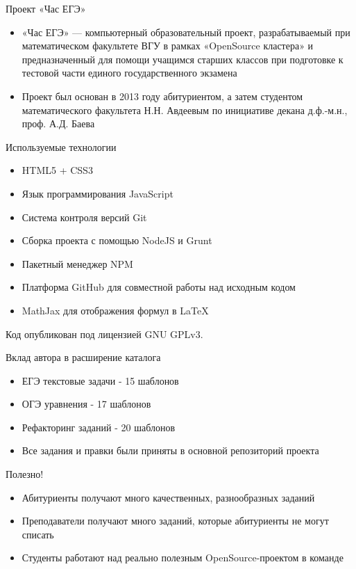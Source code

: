 \documentclass[aspectratio=169,12pt]{beamer}
\begin{document}
  \begin{frame}{Проект «Час ЕГЭ»}
	\large
	\begin{itemize}
		\item «Час ЕГЭ» — компьютерный образовательный проект, разрабатываемый при математическом факультете ВГУ в рамках «OpenSource кластера» и предназначенный для помощи учащимся старших классов при подготовке к тестовой части единого государственного экзамена
		
		\item Проект был основан в 2013 году абитуриентом, а затем студентом математического факультета Н.Н. Авдеевым по инициативе декана д.ф.-м.н., проф. А.Д. Баева
	\end{itemize}
\end{frame}

\begin{frame}{Используемые технологии}
	\begin{itemize}
		\item
			HTML5 + CSS3
		\item
			Язык программирования JavaScript
		\item
			Система контроля версий Git
		\item
			Сборка проекта с помощью NodeJS и Grunt
		\item
			Пакетный менеджер NPM
		\item
			Платформа GitHub для совместной работы над исходным кодом
        \item
			MathJax для отображения формул в \LaTeX
	\end{itemize}
	Код опубликован под лицензией GNU GPLv3.
\end{frame}

\begin{frame}{Вклад автора в расширение каталога}
	\begin{itemize}
		\item ЕГЭ текстовые задачи - 15 шаблонов
		\item ОГЭ уравнения - 17 шаблонов
		\item Рефакторинг заданий - 20 шаблонов
		\item Все задания и правки были приняты в основной репозиторий проекта
	\end{itemize}
\end{frame}

\begin{frame}{Полезно!}
	\begin{itemize}
		\item
			Абитуриенты получают много качественных, разнообразных заданий
		\item
			Преподаватели получают много заданий, которые абитуриенты не могут списать
		\item
			Студенты работают над реально полезным OpenSource-проектом в команде
	\end{itemize}
\end{frame}
\end{document}
